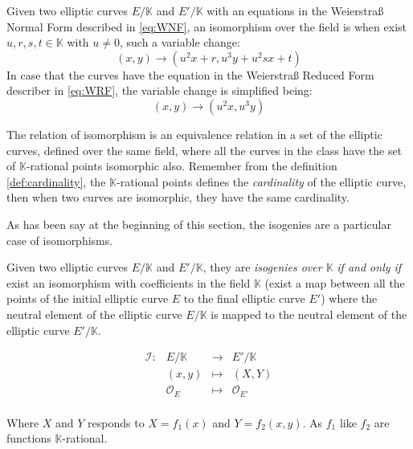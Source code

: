 \documentclass[10pt,a4paper,twoside]{llncs}
\begin{document}
\begin{definition}\label{def:isomorphism}
 Given two elliptic curves $E/\mathbb{K}$ and $E'/\mathbb{K}$ with an equations in the Weierstra\ss{} Normal Form described in \ref{eq:WNF}, an isomorphism over the field is when exist $u,r,s,t\in\mathbb{K}$ with $u\neq0$, such a variable change:
\begin{equation}\label{eq:isomorphisminWNF}
 (x,y) \rightarrow (u^2x+r,u^3y+u^2sx+t)
\end{equation}
In case that the curves have the equation in the Weierstra\ss{} Reduced Form describer in \ref{eq:WRF}, the variable change is simplified being:
\begin{equation}\label{eq:isomorphisminWRF}
 (x,y) \rightarrow (u^2x,u^3y)
\end{equation}
\end{definition}

The relation of isomorphism is an equivalence relation in a set of the elliptic curves, defined over the same field, where all the curves in the class have the set of $\mathbb{K}$-rational points isomorphic also. Remember from the definition \ref{def:cardinality}, the $\mathbb{K}$-rational points defines the \emph{cardinality} of the elliptic curve, then when two curves are isomorphic, they have the same cardinality.

As has been say at the beginning of this section, the isogenies are a particular case of isomorphisms.

\begin{definition}\label{def:isogeny}
 Given two elliptic curves $E/\mathbb{K}$ and $E'/\mathbb{K}$, they are \emph{isogenies over $\mathbb{K}$} \emph{if and only if} exist an isomorphism with coefficients in the field $\mathbb{K}$ (exist a map between all the points of the initial elliptic curve $E$ to the final elliptic curve $E'$) where the neutral element of the elliptic curve $E/\mathbb{K}$ is mapped to the neutral element of the elliptic curve $E'/\mathbb{K}$.

\begin{equation}\label{eq:isogenia}
        \begin{array}{cccc}
                \mathcal{I}: & E/\mathbb{K} & \rightarrow & E'/\mathbb{K} \\
                \;           & (x,y)        & \mapsto     & (X,Y) \\
                \;           & \mathcal{O}_{E} & \mapsto  & \mathcal{O}_{E'} \\
        \end{array}
\end{equation}

Where $X$ and $Y$ responds to $X=f_{1}(x)$ and $Y=f_{2}(x,y)$. As $f_{1}$ like $f_{2}$ are functions $\mathbb{K}$-rational.
\end{definition}
\end{document}
